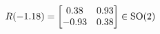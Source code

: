 \documentclass[preview]{standalone}
\begin{document}
\begin{align*}
\special{dvisvgm:raw <g id='unique000'>}R(-1.18) = \begin{bmatrix} 0.38 & 0.93 \\ -0.93 & 0.38 \end{bmatrix} \in \text{SO}(2)\special{dvisvgm:raw </g>}
\end{align*}
\end{document}
